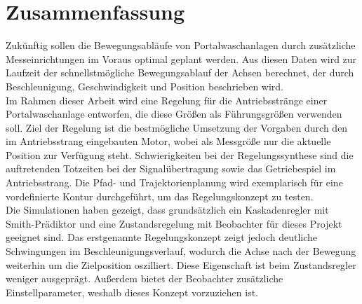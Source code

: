 \thispagestyle{plain}
\onehalfspacing
\section*{Zusammenfassung}
Zukünftig sollen die Bewegungsabläufe von Portalwaschanlagen durch zusätzliche Messeinrichtungen im Voraus optimal geplant werden. Aus diesen Daten wird zur Laufzeit der schnellstmögliche Bewegungsablauf der Achsen berechnet, der durch Beschleunigung, Geschwindigkeit und Position beschrieben wird.\\
Im Rahmen dieser Arbeit wird eine Regelung für die Antriebsstränge einer Portalwaschanlage entworfen, die diese Größen als Führungsgrößen verwenden soll. Ziel der Regelung ist die bestmögliche Umsetzung der Vorgaben durch den im Antriebsstrang eingebauten Motor, wobei als Messgröße nur die aktuelle Position zur Verfügung steht.
Schwierigkeiten bei der Regelungssynthese sind die auftretenden Totzeiten bei der Signalübertragung sowie das Getriebespiel im Antriebsstrang.
Die Pfad- und Trajektorienplanung wird exemplarisch für eine vordefinierte Kontur durchgeführt, um das Regelungskonzept zu testen.\\
Die Simulationen haben gezeigt, dass grundsätzlich ein Kaskadenregler mit Smith-Prädiktor und eine Zustandsregelung mit Beobachter für dieses Projekt geeignet sind. Das erstgenannte Regelungskonzept zeigt jedoch deutliche Schwingungen im Beschleunigungsverlauf, wodurch die Achse nach der Bewegung weiterhin um die Zielposition oszilliert. Diese Eigenschaft ist beim Zustandsregler weniger ausgeprägt. Außerdem bietet der Beobachter zusätzliche Einstellparameter, weshalb dieses Konzept vorzuziehen ist.


